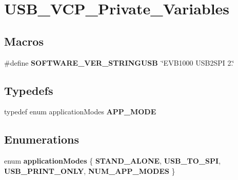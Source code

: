\hypertarget{group__USB__VCP__Private__Variables}{\section{U\-S\-B\-\_\-\-V\-C\-P\-\_\-\-Private\-\_\-\-Variables}
\label{group__USB__VCP__Private__Variables}
}
\subsection*{Macros}
\begin{DoxyCompactItemize}
\item 
\hypertarget{group__USB__VCP__Private__Variables_ga07f5b13e18da13eb3df6bf002d56afd7}{\#define {\bfseries S\-O\-F\-T\-W\-A\-R\-E\-\_\-\-V\-E\-R\-\_\-\-S\-T\-R\-I\-N\-G\-U\-S\-B}~\char`\"{}E\-V\-B1000 U\-S\-B2\-S\-P\-I 2.\char`\"{}}\label{group__USB__VCP__Private__Variables_ga07f5b13e18da13eb3df6bf002d56afd7}

\end{DoxyCompactItemize}
\subsection*{Typedefs}
\begin{DoxyCompactItemize}
\item 
\hypertarget{group__USB__VCP__Private__Variables_gabac2ff7e3510f2e2b0b864d7b88a1ea4}{typedef enum application\-Modes {\bfseries A\-P\-P\-\_\-\-M\-O\-D\-E}}\label{group__USB__VCP__Private__Variables_gabac2ff7e3510f2e2b0b864d7b88a1ea4}

\end{DoxyCompactItemize}
\subsection*{Enumerations}
\begin{DoxyCompactItemize}
\item 
enum {\bfseries application\-Modes} \{ {\bfseries S\-T\-A\-N\-D\-\_\-\-A\-L\-O\-N\-E}, 
{\bfseries U\-S\-B\-\_\-\-T\-O\-\_\-\-S\-P\-I}, 
{\bfseries U\-S\-B\-\_\-\-P\-R\-I\-N\-T\-\_\-\-O\-N\-L\-Y}, 
{\bfseries N\-U\-M\-\_\-\-A\-P\-P\-\_\-\-M\-O\-D\-E\-S}
 \}
\end{DoxyCompactItemize}
